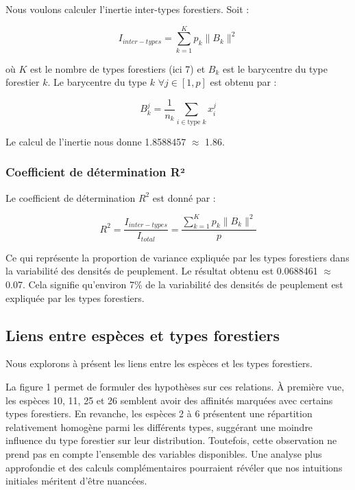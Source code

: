 \documentclass[
]{article}
\begin{document}
Nous voulons calculer l'inertie inter-types forestiers. Soit :

\[
I_{inter-types} = \sum_{k=1}^{K} p_{k}\|B_k\|^2
\]

où \(K\) est le nombre de types forestiers (ici 7) et \(B_k\) est le
barycentre du type forestier \(k\). Le barycentre du type \(k\)
\(\forall j \in [1,p]\) est obtenu par :

\[
B_{k}^{j}=\frac{1}{n_k} \sum_{i \in \text{type } k} x_{i}^{j}
\]

Le calcul de l'inertie nous donne 1.8588457 \(\approx\) 1.86.

\hypertarget{coefficient-de-duxe9termination-ruxb2}{%
\subsubsection{Coefficient de détermination
R²}\label{coefficient-de-duxe9termination-ruxb2}}

Le coefficient de détermination \(R^2\) est donné par :

\[
R^2 = \frac{I_{inter-types}}{I_{total}} = \frac {\sum_{k=1}^{K} p_{k}\|B_k\|^2}{p}
\]

Ce qui représente la proportion de variance expliquée par les types
forestiers dans la variabilité des densités de peuplement. Le résultat
obtenu est 0.0688461 \(\approx\) 0.07. Cela signifie qu'environ 7\% de
la variabilité des densités de peuplement est expliquée par les types
forestiers.

\hypertarget{liens-entre-espuxe8ces-et-types-forestiers}{%
\subsection{Liens entre espèces et types
forestiers}\label{liens-entre-espuxe8ces-et-types-forestiers}}

Nous explorons à présent les liens entre les espèces et les types
forestiers.

La figure 1 permet de formuler des hypothèses sur ces relations. À
première vue, les espèces 10, 11, 25 et 26 semblent avoir des affinités
marquées avec certains types forestiers. En revanche, les espèces 2 à 6
présentent une répartition relativement homogène parmi les différents
types, suggérant une moindre influence du type forestier sur leur
distribution. Toutefois, cette observation ne prend pas en compte
l'ensemble des variables disponibles. Une analyse plus approfondie et
des calculs complémentaires pourraient révéler que nos intuitions
initiales méritent d'être nuancées.
\end{document}
